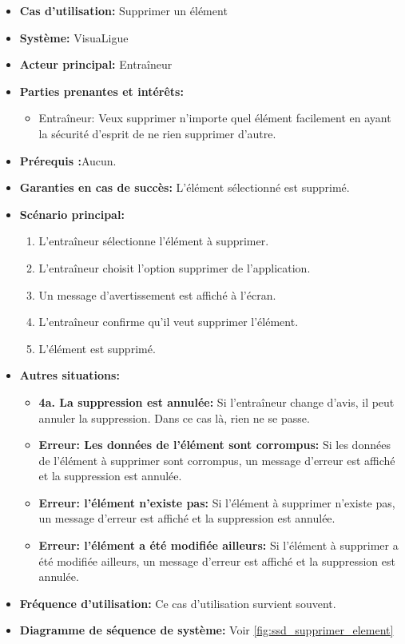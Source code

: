 \begin{itemize}
    \item \textbf{Cas d'utilisation:} Supprimer un \'el\'ement
    \item \textbf{Syst\`eme:} VisuaLigue
    \item \textbf{Acteur principal:} Entra\^ineur
    \item \textbf{Parties prenantes et int\'er\^ets:}
        \begin{itemize}
            \item Entraîneur: Veux supprimer n'importe quel élément facilement en ayant la sécurité d'esprit de ne rien supprimer d'autre.
        \end{itemize}
    \item \textbf{Pr\'erequis :}Aucun.
    \item \textbf{Garanties en cas de succ\`es:} L'élément sélectionné est supprimé.
    \item \textbf{Sc\'enario principal:}
        \begin{enumerate}
            \item L'entraîneur sélectionne l'élément à supprimer.
            \item L'entraîneur choisit l'option supprimer de l'application.
            \item Un message d'avertissement est affiché à l'écran.
            \item L'entraîneur confirme qu'il veut supprimer l'\'el\'ement.
            \item L'\'el\'ement est supprim\'e.
        \end{enumerate}
    \item \textbf{Autres situations:}
        \begin{itemize}
            \item \textbf{4a. La suppression est annul\'ee:} Si l'entraîneur change d'avis, il peut annuler la suppression. Dans ce cas l\`a, rien ne se passe.
            \item \textbf{Erreur: Les donn\'ees de l'\'el\'ement sont corrompus:} Si les donn\'ees de l'\'el\'ement \`a supprimer sont corrompus, un message d'erreur est affich\'e et la suppression est annul\'ee.
            \item \textbf{Erreur: l'\'el\'ement n'existe pas:} Si l'\'el\'ement \`a supprimer n'existe pas, un message d'erreur est affich\'e et la suppression est annul\'ee.
            \item \textbf{Erreur: l'\'el\'ement a \'et\'e modifi\'ee ailleurs:} Si l'\'el\'ement \`a supprimer a \'et\'e modifi\'ee ailleurs, un message d'erreur est affich\'e et la suppression est annul\'ee.
        \end{itemize}
    \item \textbf{Fréquence d'utilisation:} Ce cas d'utilisation survient souvent.
    \item \textbf{Diagramme de s\'equence de syst\`eme:} Voir \ref{fig:ssd_supprimer_element}
\end{itemize}

